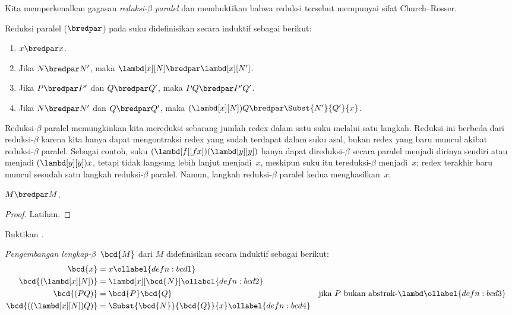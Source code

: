 \documentclass[../../../include/open-logic-section]{subfiles}
\begin{document}


Kita memperkenalkan gagasan \emph{reduksi-$\beta$ paralel} dan membuktikan
bahwa reduksi tersebut mempunyai sifat Church--Rosser.

\begin{defn} 
  Reduksi paralel ($\bredpar$) pada suku didefinisikan secara induktif sebagai
  berikut:
  \begin{enumerate}
    \item {} $x \bredpar x$.
    \item {} Jika $N \bredpar N'$, maka
      $\lambd[x][N] \bredpar \lambd[x][N']$.
    \item {} Jika $P \bredpar P'$ dan $Q \bredpar Q'$,
      maka $PQ \bredpar P'Q'$.
    \item {} Jika $N \bredpar N'$ dan $Q \bredpar Q'$,
      maka $(\lambd[x][N])Q \bredpar \Subst{N'}{Q'}{x}$.
  \end{enumerate}
\end{defn}

Reduksi-$\beta$ paralel memungkinkan kita mereduksi sebarang jumlah redex
dalam satu suku melalui satu langkah. Reduksi ini berbeda dari
reduksi-$\beta$ karena kita hanya dapat mengontraksi redex yang sudah terdapat
dalam suku asal, bukan redex yang baru muncul akibat reduksi-$\beta$ paralel.
Sebagai contoh, suku $(\lambd[f][fx])(\lambd[y][y])$ hanya dapat direduksi-$\beta$
secara paralel menjadi dirinya sendiri atau menjadi $(\lambd[y][y])x$, tetapi
tidak langsung lebih lanjut menjadi~$x$, meskipun suku itu tereduksi-$\beta$
menjadi~$x$; redex terakhir baru muncul sesudah satu langkah reduksi-$\beta$
paralel. Namun, langkah reduksi-$\beta$ paralel kedua menghasilkan~$x$.

\begin{thm}
  $M \bredpar M$.
\end{thm}

\begin{proof}
  Latihan.
\end{proof}

\begin{prob}
  Buktikan .
\end{prob}

\begin{defn}
  \emph{Pengembangan lengkap-$\beta$}~$\bcd{M}$ dari $M$ didefinisikan secara
  induktif sebagai berikut:
  \begin{align}
    \bcd{x} &= x \ollabel{defn:bcd1} \\
    \bcd{(\lambd[x][N])} &= \lambd[x][\bcd{N}] \ollabel{defn:bcd2}\\
    \bcd{(PQ)} &= \bcd{P}\bcd{Q} && \text{jika $P$ bukan abstrak-$\lambd$}
    \ollabel{defn:bcd3} \\
    \bcd{((\lambd[x][N])Q)} &= \Subst{\bcd{N}}{\bcd{Q}}{x} \ollabel{defn:bcd4}
  \end{align}
\end{defn}
\end{document}

